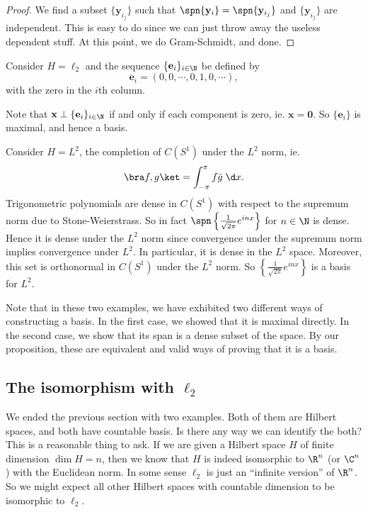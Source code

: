 \documentclass[a4paper]{article}
\begin{document}
\begin{proof}
  We find a subset $\{\mathbf{y}_{i_j}\}$ such that $\spn \{\mathbf{y}_i\} = \spn\{\mathbf{y}_{i_j}\}$ and $\{\mathbf{y}_{i_j}\}$ are independent. This is easy to do since we can just throw away the useless dependent stuff. At this point, we do Gram-Schmidt, and done.
\end{proof}

\begin{eg}
  Consider $H = \ell_2$ and the sequence $\{\mathbf{e}_i\}_{i \in \N}$ be defined by
  \[
    \mathbf{e}_i = (0, 0, \cdots, 0, 1, 0, \cdots),
  \]
  with the zero in the $i$th column.

  Note that $\mathbf{x} \perp \{\mathbf{e}_i\}_{i \in \N}$ if and only if each component is zero, ie. $\mathbf{x} = \mathbf{0}$. So $\{\mathbf{e}_i\}$ is maximal, and hence a basis.
\end{eg}

\begin{eg}
  Consider $H = L^2$, the completion of $C(S^1)$ under the $L^2$ norm, ie.
  \[
    \bra f, g\ket = \int_{-\pi}^\pi f\bar{g}\;\d x.
  \]
  Trigonometric polynomials are dense in $C(S^1)$ with respect to the supremum norm due to Stone-Weierstrass. So in fact $\spn \left\{\frac{1}{\sqrt{2\pi}}e^{inx}\right\}$ for $n \in \N$ is dense. Hence it is dense under the $L^2$ norm since convergence under the supremum norm implies convergence under $L^2$. In particular, it is dense in the $L^2$ space. Moreover, this set is orthonormal in $C(S^1)$ under the $L^2$ norm. So $\left\{\frac{1}{\sqrt{2\pi}} e^{inx}\right\}$ is a basis for $L^2$.
\end{eg}
Note that in these two examples, we have exhibited two different ways of constructing a basis. In the first case, we showed that it is maximal directly. In the second case, we show that its span is a dense subset of the space. By our proposition, these are equivalent and valid ways of proving that it is a basis.

\subsection{The isomorphism with \texorpdfstring{$\ell_2$}{l2}}
We ended the previous section with two examples. Both of them are Hilbert spaces, and both have countable basis. Is there any way we can identify the both? This is a reasonable thing to ask. If we are given a Hilbert space $H$ of finite dimension $\dim H = n$, then we know that $H$ is indeed isomorphic to $\R^n$ (or $\C^n$) with the Euclidean norm. In some sense $\ell_2$ is just an ``infinite version'' of $\R^n$. So we might expect all other Hilbert spaces with countable dimension to be isomorphic to $\ell_2$.
\end{document}
